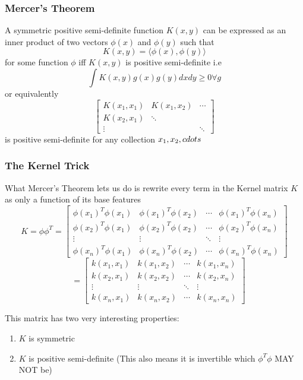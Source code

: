 \documentclass[hidelinks]{book}
\numberwithin{equation}{section}
\begin{document}
\subsubsection{Mercer's Theorem}
A symmetric positive semi-definite function $K(x, y)$ can be expressed as an inner product of two vectors $\phi(x)$ and $\phi(y)$ such that
$$ K(x, y) = \langle \phi(x), \phi(y) \rangle $$ for some function $\phi$ iff
$K(x,y)$ is positive semi-definite i.e
$$ \int K(x, y) g(x) g(y) dx dy \geq 0 \forall g $$ or equivalently
$$ \begin{bmatrix} K(x_1, x_1) & K(x_1, x_2) & \cdots \\ K(x_2, x_1) & \ddots
& \\ \vdots & & \ddots \end{bmatrix} $$ is positive semi-definite for any
collection ${x_1, x_2, \\cdots}$

\subsubsection{The Kernel Trick}
What Mercer's Theorem lets us do is rewrite every term in the Kernel matrix
$K$ as only a function of its base features $$ K = \phi \phi^T = \begin{bmatrix}
\phi(x_1)^T \phi(x_1) & \phi(x_1)^T \phi(x_2) & \cdots & \phi(x_1)^T \phi(x_n)
\\ \phi(x_2)^T \phi(x_1) & \phi(x_2)^T \phi(x_2) & \cdots & \phi(x_2)^T \phi(x_n)
\\ \vdots & \vdots & \ddots & \vdots \\ \phi(x_n)^T \phi(x_1) & \phi(x_n)^T \phi(x_2)
& \cdots & \phi(x_n)^T \phi(x_n) \end{bmatrix}$$
$$ \quad = \begin{bmatrix}
k(x_1, x_1) & k(x_1, x_2) & \cdots & k(x_1, x_n) \\ k(x_2, x_1) & k(x_2, x_2)
& \cdots & k(x_2, x_n) \\ \vdots & \vdots & \ddots & \vdots \\ k(x_n, x_1) &
k(x_n, x_2) & \cdots & k(x_n, x_n) \end{bmatrix} $$

This matrix has two very interesting properties:
\begin{enumerate}
\item $K$ is symmetric
\item $K$ is positive semi-definite (This also means it is invertible which $\phi^T \phi$ MAY NOT be)
\end{enumerate}
\end{document}
